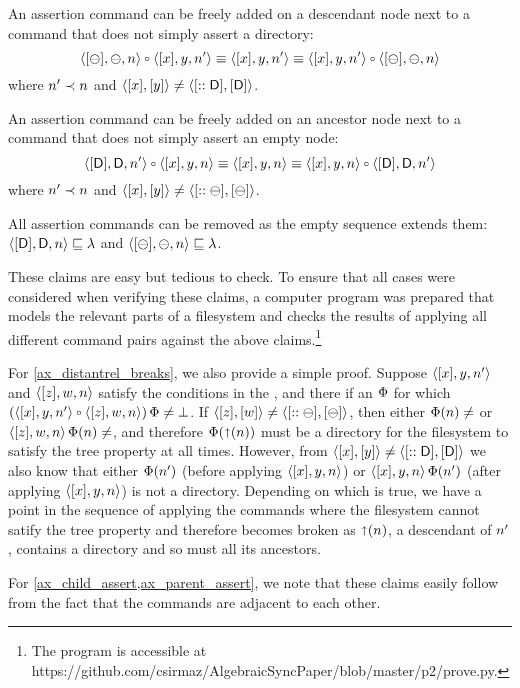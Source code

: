 \begin{mylem}
\begin{list}{\bf Rule~.}{}
\item{}
An assertion command can be freely added on a descendant node
next to a command that does not simply assert a directory:
\[ \cbba{n}\cc\cxynnv \equiv \cxynnv \equiv \cxynnv\cc\cbba{n} \] 
where $n'\prec n$ and $\langle{[x],[y]}\rangle\neq\langle{[::\mathsf{D}],[\mathsf{D}]}\rangle$.

\item{}
An assertion command can be freely added on an ancestor node
next to a command that does not simply assert an empty node:
\[ \cdda{\nn}\cc\cxynv \equiv \cxynv \equiv \cxynv\cc\cdda{\nn} \]
where $n'\prec n$ and $\langle{[x],[y]}\rangle\neq\langle{[::\ominus],[\ominus]}\rangle$.

\item{}
All assertion commands can be removed as the empty sequence extends them:
$\langle{[\mathsf{D}],\mathsf{D},n}\rangle\sqsubseteq\lambda$ and $\langle{[\ominus],\ominus,n}\rangle\sqsubseteq\lambda$.

\end{list}
\end{mylem}

These claims are easy but tedious to check.
To ensure that all cases were considered when verifying these claims,
a computer program was prepared that models the relevant parts of
a filesystem and checks the results of applying all different command pairs
against the above claims.\footnote{The program is accessible at \\ 
https://github.com/csirmaz/AlgebraicSyncPaper/blob/master/p2/prove.py.}

For \cref{ax_distantrel_breaks}, we also provide a simple proof.
Suppose $\langle{[x],y,n'}\rangle$ and $\langle{[z],w,n}\rangle$ satisfy the conditions in the ,
and there if an $\Phi$ for which $(\cxynnv\cc\czwnv)\aFS\neq\fsbroken$.
If $\langle{[z],[w]}\rangle\neq\langle{[::\ominus],[\ominus]}\rangle$, then either $\FS(n)\neq\empty$ or $\czwnv\aFS(n)\neq\empty$,
and therefore $\Phi(\mathord{\shortuparrow}({n}))$ must be a directory for the filesystem to satisfy
the tree property at all times.
However, from $\langle{[x],[y]}\rangle\neq\langle{[::\mathsf{D}],[\mathsf{D}]}\rangle$ we also know that either $\Phi(n')$ 
(before applying $\langle{[x],y,n}\rangle$) or $\langle{[x],y,n}\rangle\,\Phi(n')$ (after applying $\langle{[x],y,n}\rangle$)
is not a directory. Depending on which is true, we have a point in the sequence
of applying the commands where the filesystem cannot satify the tree property
and therefore becomes broken as $\mathord{\shortuparrow}({n})$, a descendant of $n'$, contains
a directory and so must all its ancestors.

For \cref{ax_child_assert,ax_parent_assert}, we note that these claims
easily follow from the fact that the commands are adjacent to each other.

